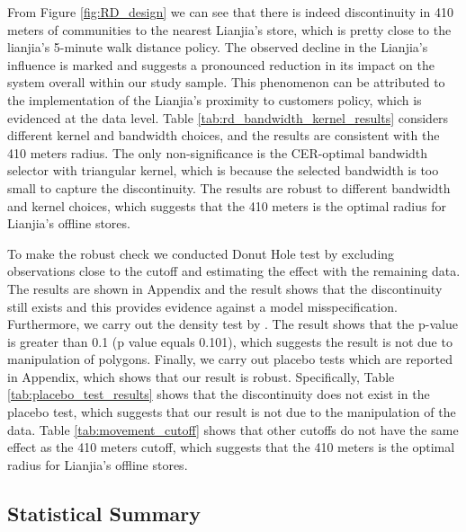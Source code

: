 \documentclass[12pt]{article}
\begin{document}


From Figure \ref{fig:RD_design} we can see that there is indeed discontinuity in 410 meters of communities to the nearest Lianjia's store, which is pretty close to the lianjia's 5-minute walk distance policy. The observed decline in the Lianjia's influence is marked and suggests a pronounced reduction in its impact on the system overall within our study sample. This phenomenon can be attributed to the implementation of the Lianjia's proximity to customers policy, which is evidenced at the data level. Table \ref{tab:rd_bandwidth_kernel_results} considers different kernel and bandwidth choices, and the results are consistent with the 410 meters radius. The only non-significance is the CER-optimal bandwidth selector with triangular kernel, which is because the selected bandwidth is too small to capture the discontinuity. The results are robust to different bandwidth and kernel choices, which suggests that the 410 meters is the optimal radius for Lianjia's offline stores.

To make the robust check we conducted Donut Hole test by excluding observations close to the cutoff and estimating the effect with the remaining data. The results are shown in Appendix and the result shows that the discontinuity still exists and this provides evidence against a model misspecification. Furthermore, we carry out the density test by \citep{MCCRARY2008698}. The result shows that the p-value is greater than 0.1 (p value equals 0.101), which suggests the result is not due to manipulation of polygons. Finally, we carry out placebo tests which are reported in Appendix, which shows that our result is robust. Specifically, Table \ref{tab:placebo_test_results} shows that the discontinuity does not exist in the placebo test, which suggests that our result is not due to the manipulation of the data. Table \ref{tab:movement_cutoff} shows that other cutoffs do not have the same effect as the 410 meters cutoff, which suggests that the 410 meters is the optimal radius for Lianjia's offline stores.

\subsection{Statistical Summary} \label{subsec:Statistical_Summary}
\end{document}

